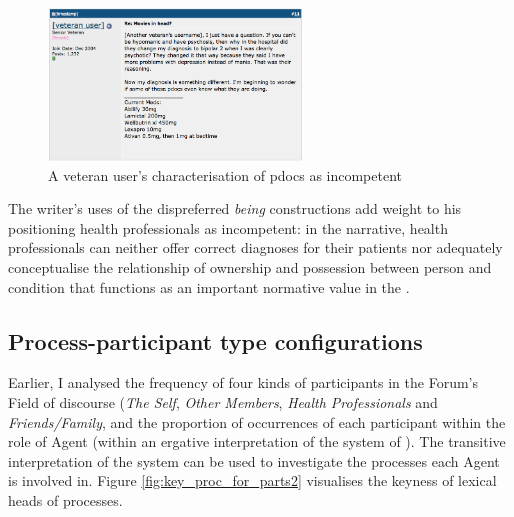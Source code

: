 
\begin{figure}[H]
  \begin{center}
  \includegraphics[width=0.6\textwidth]{../images/incomppdocs.png}
  \end{center}
  \caption{A veteran user's characterisation of pdocs as incompetent}
  \label{fig:incomppdocs}
  \end{figure}
%
\noindent The writer's uses of the dispreferred \emph{being} constructions add weight to his positioning health professionals as incompetent: in the narrative, health professionals can neither offer correct diagnoses for their patients nor adequately conceptualise the relationship of ownership and possession between person and condition that functions as an important normative value in the .

\subsection{Process-participant type configurations}

Earlier, I analysed the frequency of four kinds of participants in the Forum's Field of discourse (\emph{The Self}, \emph{Other Members}, \emph{Health Professionals} and \emph{Friends\slash Family}, and the proportion of occurrences of each participant within the role of Agent (within an ergative interpretation of the system of ). The transitive interpretation of the system can be used to investigate the processes each Agent is involved in. Figure \ref{fig:key_proc_for_parts2} visualises the keyness of lexical heads of processes.

